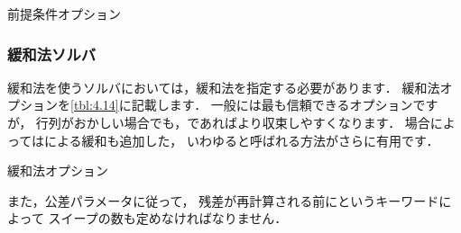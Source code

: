 \begin{table}[ht]
 
 \caption{前提条件オプション}
 \label{tbl:4.13}
\end{table}


\subsubsection{緩和法ソルバ}
\label{sssec:4.5.1.3}
緩和法を使うソルバにおいては，緩和法を指定する必要があります．
緩和法オプションを\autoref{tbl:4.14}に記載します．
一般には最も信頼できるオプションですが，
行列がおかしい場合でも，であればより収束しやすくなります．
場合によってはによる緩和も追加した，
いわゆると呼ばれる方法がさらに有用です．


\begin{table}[ht]
 
 \caption{緩和法オプション}
 \label{tbl:4.14}
\end{table}


また，公差パラメータに従って，
残差が再計算される前にというキーワードによって
スイープの数も定めなければなりません．


